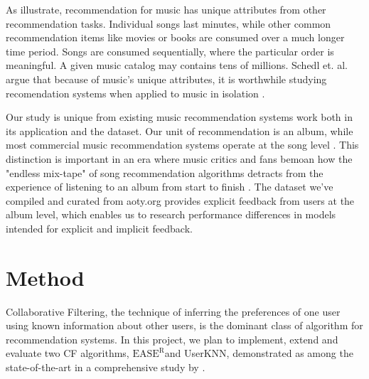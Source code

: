 \documentclass{article}
\newcommand{\easer}{$\text{EASE}^\text{R}$}
\newcommand{\userknn}{UserKNN\xspace}
\begin{document}
As \citet{Schedl2018} illustrate, recommendation for music has unique
 attributes from other recommendation tasks.
Individual songs last minutes, while other common recommendation items like
 movies or books are consumed over a much longer time period.
Songs are consumed sequentially, where the particular order is meaningful.
A given music catalog may contains tens of millions.
Schedl et.
al. argue that because of music's unique attributes, it is
worthwhile
studying recomendation systems when applied to music
in isolation \citep{Schedl2018}.

Our study is unique from existing music recommendation systems work both in its
 application and the dataset.
Our unit of recommendation is an album, while most commercial music
 recommendation systems operate at the song level \citep{Schedl2018}.
This distinction is important in an era where music critics and fans bemoan how
 the "endless mix-tape" of song recommendation algorithms detracts from the
 experience of listening to an album from start to finish
 \citep{thoth2018,hilton2013}.
The dataset we've compiled and curated from aoty.org provides explicit feedback
 from users at the album level, which enables us to research performance
 differences in models intended for explicit and implicit feedback.

\section{Method}
Collaborative Filtering, the technique of inferring the preferences of one user
 using known information about other users, is the dominant class of algorithm
 for recommendation systems.
In this project, we plan to implement, extend and evaluate two CF algorithms,
 \easer and \userknn, demonstrated as among the state-of-the-art in a
 comprehensive study by \citet{anelliTopNRecommendationAlgorithms2022}.
\end{document}

